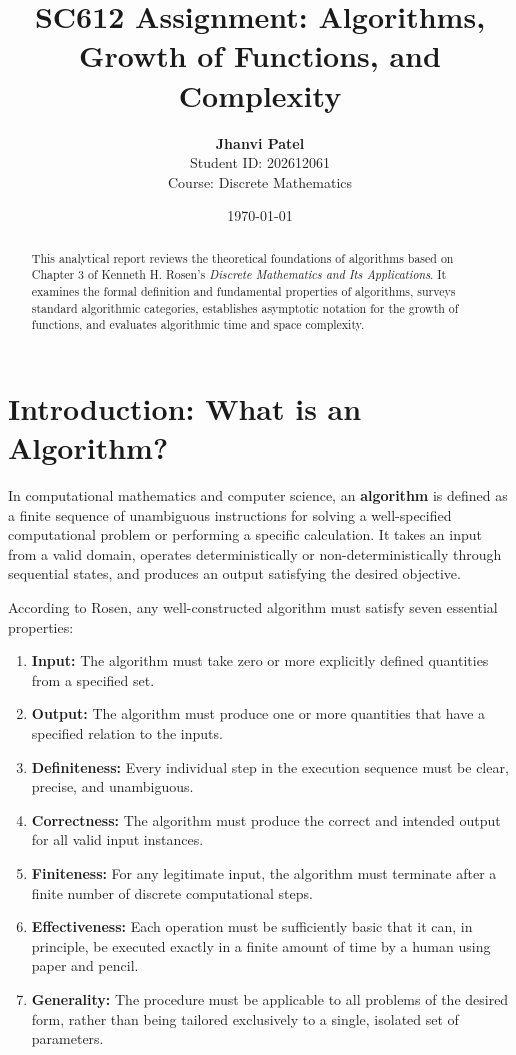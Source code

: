\documentclass[11pt,a4paper]{article}
\title{\textbf{SC612 Assignment: Algorithms, Growth of Functions, and Complexity}}
\author{\textbf{Jhanvi Patel} \\ Student ID: 202612061 \\ Course: Discrete Mathematics}
\date{\today}
\begin{document}
\maketitle

\begin{abstract}
This analytical report reviews the theoretical foundations of algorithms based on Chapter 3 of Kenneth H. Rosen's \emph{Discrete Mathematics and Its Applications}. It examines the formal definition and fundamental properties of algorithms, surveys standard algorithmic categories, establishes asymptotic notation for the growth of functions, and evaluates algorithmic time and space complexity.
\end{abstract}

\section{Introduction: What is an Algorithm?}
In computational mathematics and computer science, an \textbf{algorithm} is defined as a finite sequence of unambiguous instructions for solving a well-specified computational problem or performing a specific calculation. It takes an input from a valid domain, operates deterministically or non-deterministically through sequential states, and produces an output satisfying the desired objective.

According to Rosen, any well-constructed algorithm must satisfy seven essential properties:
\begin{enumerate}
    \item \textbf{Input:} The algorithm must take zero or more explicitly defined quantities from a specified set.
    \item \textbf{Output:} The algorithm must produce one or more quantities that have a specified relation to the inputs.
    \item \textbf{Definiteness:} Every individual step in the execution sequence must be clear, precise, and unambiguous.
    \item \textbf{Correctness:} The algorithm must produce the correct and intended output for all valid input instances.
    \item \textbf{Finiteness:} For any legitimate input, the algorithm must terminate after a finite number of discrete computational steps.
    \item \textbf{Effectiveness:} Each operation must be sufficiently basic that it can, in principle, be executed exactly in a finite amount of time by a human using paper and pencil.
    \item \textbf{Generality:} The procedure must be applicable to all problems of the desired form, rather than being tailored exclusively to a single, isolated set of parameters.
\end{enumerate}
\end{document}
